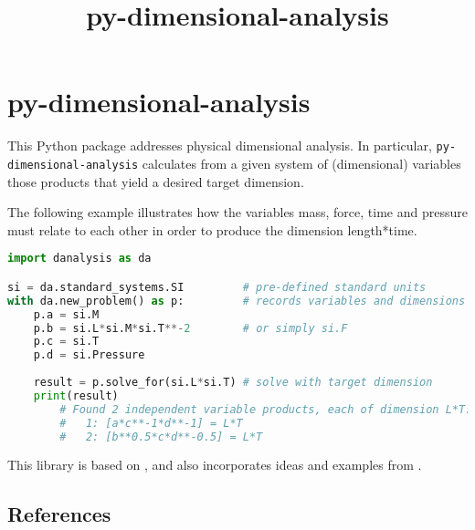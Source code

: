 \documentclass[11pt]{article}
\title{py-dimensional-analysis}
\date{}
\begin{document}
\maketitle

\section{py-dimensional-analysis}
This Python package addresses physical dimensional analysis. In particular, \texttt{py-dimensional-analysis} calculates from a given system of (dimensional) variables those products that yield a desired target dimension.


The following example illustrates how the variables mass, force, time and pressure must relate to each other in order to produce the dimension length*time.

\begin{lstlisting}[language=Python]
import danalysis as da

si = da.standard_systems.SI         # pre-defined standard units
with da.new_problem() as p:         # records variables and dimensions
    p.a = si.M
    p.b = si.L*si.M*si.T**-2        # or simply si.F
    p.c = si.T
    p.d = si.Pressure
    
    result = p.solve_for(si.L*si.T) # solve with target dimension
    print(result)
        # Found 2 independent variable products, each of dimension L*T:
        #   1: [a*c**-1*d**-1] = L*T
        #   2: [b**0.5*c*d**-0.5] = L*T
\end{lstlisting}

This library is based on \cite{szirtes2007applied}, and also incorporates ideas and examples from \cite{santiago2019first, sonin2001dimensional}.

\subsection{References}

\begingroup
\renewcommand{\section}[2]{}%

\endgroup
\end{document}
